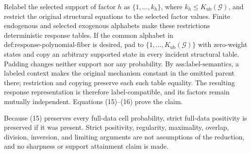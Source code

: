 Relabel the selected support of factor \(h\) as \(\{1,\ldots,k_h\}\), where \(k_h\leq K_{\mathrm{ub}}(\mathcal G)\), and restrict the original structural equations to the selected factor values. Finite endogenous and selected exogenous alphabets make these restrictions deterministic response tables. If the common alphabet in \(\text{def:response-polynomial-fiber}\) is desired, pad to \(\{1,\ldots,K_{\mathrm{ub}}(\mathcal G)\}\) with zero-weight states and copy an arbitrary supported state in every incident structural table. Padding changes neither support nor any probability. By \(\text{ass:label-semantics}\), a labeled context makes the original mechanism constant in the omitted parent there; restriction and copying preserve each such table equality. The resulting response representation is therefore label-compatible, and its factors remain mutually independent. Equations (15)--(16) prove the claim.

Because (15) preserves every full-data cell probability, strict full-data positivity is preserved if it was present. Strict positivity, regularity, maximality, overlap, division, inversion, and limiting arguments are not assumptions of the reduction, and no sharpness or support attainment claim is made.